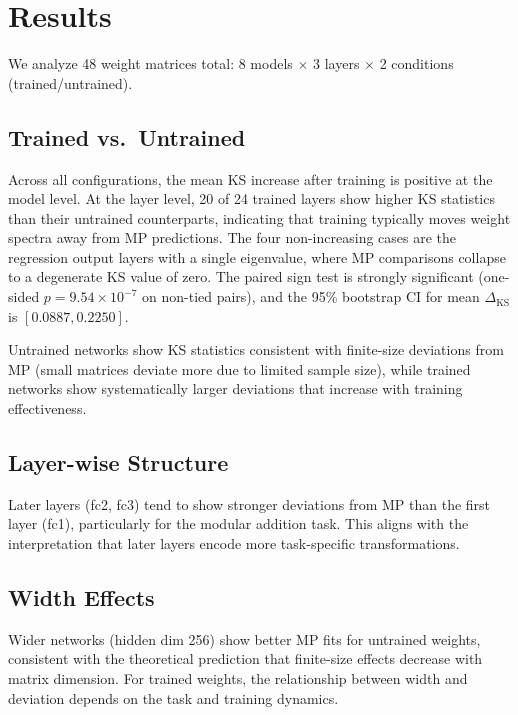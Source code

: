 \documentclass[11pt]{article}
\begin{document}
\section{Results}

We analyze 48 weight matrices total: 8 models $\times$ 3 layers $\times$ 2 conditions (trained/untrained).

\subsection{Trained vs.\ Untrained}

Across all configurations, the mean KS increase after training is positive at the model level.
At the layer level, 20 of 24 trained layers show higher KS statistics than their untrained counterparts, indicating that training typically moves weight spectra away from MP predictions.
The four non-increasing cases are the regression output layers with a single eigenvalue, where MP comparisons collapse to a degenerate KS value of zero.
The paired sign test is strongly significant (one-sided $p=9.54\times10^{-7}$ on non-tied pairs), and the 95\% bootstrap CI for mean $\Delta_{\mathrm{KS}}$ is $[0.0887, 0.2250]$.

Untrained networks show KS statistics consistent with finite-size deviations from MP (small matrices deviate more due to limited sample size), while trained networks show systematically larger deviations that increase with training effectiveness.

\subsection{Layer-wise Structure}

Later layers (fc2, fc3) tend to show stronger deviations from MP than the first layer (fc1), particularly for the modular addition task.
This aligns with the interpretation that later layers encode more task-specific transformations.

\subsection{Width Effects}

Wider networks (hidden dim 256) show better MP fits for untrained weights, consistent with the theoretical prediction that finite-size effects decrease with matrix dimension.
For trained weights, the relationship between width and deviation depends on the task and training dynamics.
\end{document}
